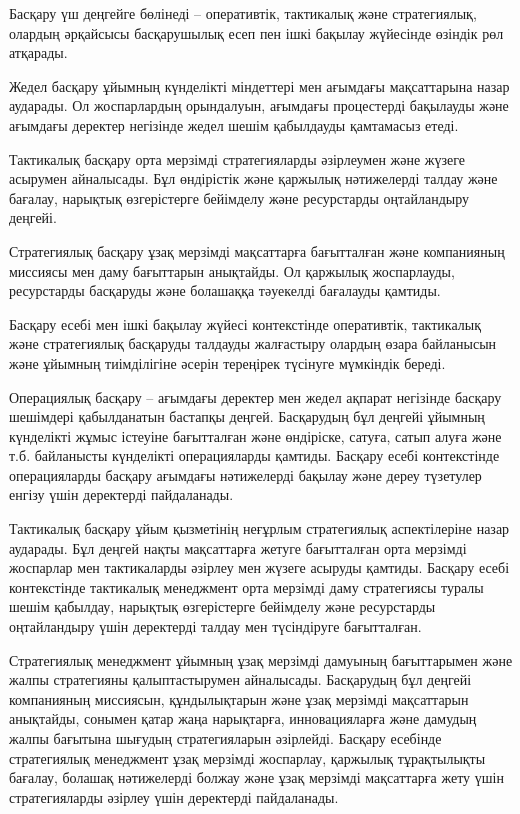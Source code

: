   \begin{multicols}{2}

Басқару үш деңгейге бөлінеді -- оперативтік, тактикалық және
стратегиялық, олардың әрқайсысы басқарушылық есеп пен ішкі бақылау
жүйесінде өзіндік рөл атқарады.

Жедел басқару ұйымның күнделікті міндеттері мен ағымдағы мақсаттарына
назар аударады. Ол жоспарлардың орындалуын, ағымдағы процестерді
бақылауды және ағымдағы деректер негізінде жедел шешім қабылдауды
қамтамасыз етеді.

Тактикалық басқару орта мерзімді стратегияларды әзірлеумен және жүзеге
асырумен айналысады. Бұл өндірістік және қаржылық нәтижелерді талдау
және бағалау, нарықтық өзгерістерге бейімделу және ресурстарды
оңтайландыру деңгейі.

Стратегиялық басқару ұзақ мерзімді мақсаттарға бағытталған және
компанияның миссиясы мен даму бағыттарын анықтайды. Ол қаржылық
жоспарлауды, ресурстарды басқаруды және болашаққа тәуекелді бағалауды
қамтиды.

Басқару есебі мен ішкі бақылау жүйесі контекстінде оперативтік,
тактикалық және стратегиялық басқаруды талдауды жалғастыру олардың өзара
байланысын және ұйымның тиімділігіне әсерін тереңірек түсінуге мүмкіндік
береді.

Операциялық басқару -- ағымдағы деректер мен жедел ақпарат негізінде
басқару шешімдері қабылданатын бастапқы деңгей. Басқарудың бұл деңгейі
ұйымның күнделікті жұмыс істеуіне бағытталған және өндіріске, сатуға,
сатып алуға және т.б. байланысты күнделікті операцияларды қамтиды.
Басқару есебі контекстінде операцияларды басқару ағымдағы нәтижелерді
бақылау және дереу түзетулер енгізу үшін деректерді пайдаланады.

Тактикалық басқару ұйым қызметінің неғұрлым стратегиялық аспектілеріне
назар аударады. Бұл деңгей нақты мақсаттарға жетуге бағытталған орта
мерзімді жоспарлар мен тактикаларды әзірлеу мен жүзеге асыруды қамтиды.
Басқару есебі контекстінде тактикалық менеджмент орта мерзімді даму
стратегиясы туралы шешім қабылдау, нарықтық өзгерістерге бейімделу және
ресурстарды оңтайландыру үшін деректерді талдау мен түсіндіруге
бағытталған.

Стратегиялық менеджмент ұйымның ұзақ мерзімді дамуының бағыттарымен және
жалпы стратегияны қалыптастырумен айналысады. Басқарудың бұл деңгейі
компанияның миссиясын, құндылықтарын және ұзақ мерзімді мақсаттарын
анықтайды, сонымен қатар жаңа нарықтарға, инновацияларға және дамудың
жалпы бағытына шығудың стратегияларын әзірлейді. Басқару есебінде
стратегиялық менеджмент ұзақ мерзімді жоспарлау, қаржылық тұрақтылықты
бағалау, болашақ нәтижелерді болжау және ұзақ мерзімді мақсаттарға жету
үшін стратегияларды әзірлеу үшін деректерді пайдаланады.


\end{multicols}
